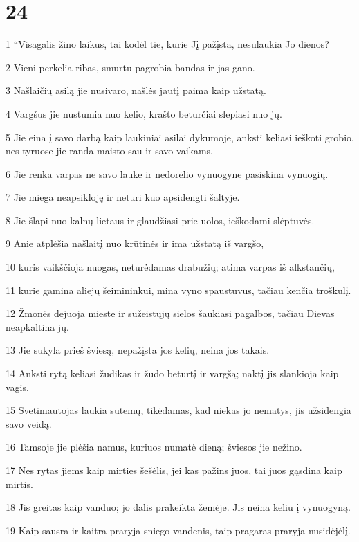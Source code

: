 \chapter{24}


\par 1 “Visagalis žino laikus, tai kodėl tie, kurie Jį pažįsta, nesulaukia Jo dienos? 
\par 2 Vieni perkelia ribas, smurtu pagrobia bandas ir jas gano. 
\par 3 Našlaičių asilą jie nusivaro, našlės jautį paima kaip užstatą. 
\par 4 Vargšus jie nustumia nuo kelio, krašto beturčiai slepiasi nuo jų. 
\par 5 Jie eina į savo darbą kaip laukiniai asilai dykumoje, anksti keliasi ieškoti grobio, nes tyruose jie randa maisto sau ir savo vaikams. 
\par 6 Jie renka varpas ne savo lauke ir nedorėlio vynuogyne pasiskina vynuogių. 
\par 7 Jie miega neapsikloję ir neturi kuo apsidengti šaltyje. 
\par 8 Jie šlapi nuo kalnų lietaus ir glaudžiasi prie uolos, ieškodami slėptuvės. 
\par 9 Anie atplėšia našlaitį nuo krūtinės ir ima užstatą iš vargšo, 
\par 10 kuris vaikščioja nuogas, neturėdamas drabužių; atima varpas iš alkstančių, 
\par 11 kurie gamina aliejų šeimininkui, mina vyno spaustuvus, tačiau kenčia troškulį. 
\par 12 Žmonės dejuoja mieste ir sužeistųjų sielos šaukiasi pagalbos, tačiau Dievas neapkaltina jų. 
\par 13 Jie sukyla prieš šviesą, nepažįsta jos kelių, neina jos takais. 
\par 14 Anksti rytą keliasi žudikas ir žudo beturtį ir vargšą; naktį jis slankioja kaip vagis. 
\par 15 Svetimautojas laukia sutemų, tikėdamas, kad niekas jo nematys, jis užsidengia savo veidą. 
\par 16 Tamsoje jie plėšia namus, kuriuos numatė dieną; šviesos jie nežino. 
\par 17 Nes rytas jiems kaip mirties šešėlis, jei kas pažins juos, tai juos gąsdina kaip mirtis. 
\par 18 Jis greitas kaip vanduo; jo dalis prakeikta žemėje. Jis neina keliu į vynuogyną. 
\par 19 Kaip sausra ir kaitra praryja sniego vandenis, taip pragaras praryja nusidėjėlį. 
